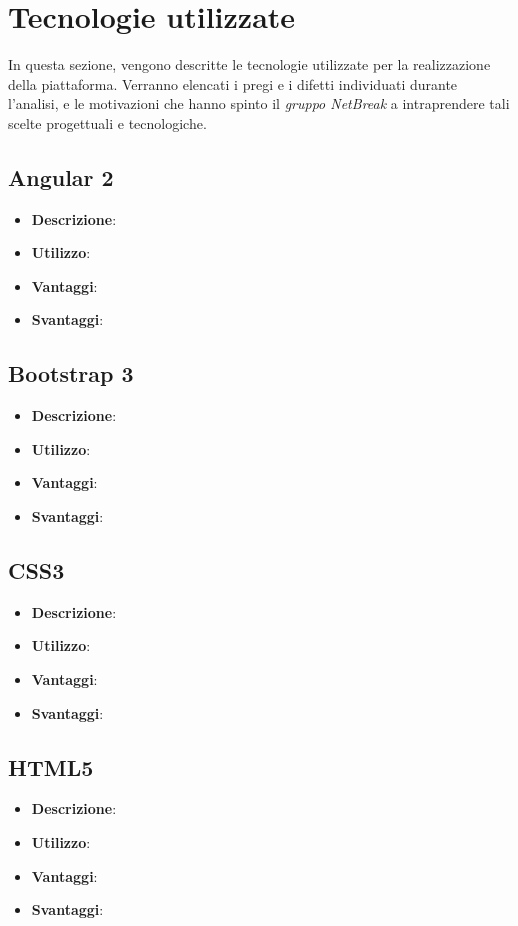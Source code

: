 \newpage
\section{Tecnologie utilizzate}
In questa sezione, vengono descritte le tecnologie utilizzate per la realizzazione della piattaforma. Verranno elencati i pregi e i difetti individuati durante l'analisi, e le motivazioni che hanno spinto il \textit{gruppo NetBreak} a intraprendere tali scelte progettuali e tecnologiche.

\subsection{Angular 2}
\begin{itemize}
	\item \textbf{Descrizione}:
	\item \textbf{Utilizzo}:
	\item \textbf{Vantaggi}:
	\item \textbf{Svantaggi}:
\end{itemize}

\subsection{Bootstrap 3}
\begin{itemize}
	\item \textbf{Descrizione}:
	\item \textbf{Utilizzo}:
	\item \textbf{Vantaggi}:
	\item \textbf{Svantaggi}:
\end{itemize}

\subsection{CSS3}
\begin{itemize}
	\item \textbf{Descrizione}:
	\item \textbf{Utilizzo}:
	\item \textbf{Vantaggi}:
	\item \textbf{Svantaggi}:
\end{itemize}

\subsection{HTML5}
\begin{itemize}
	\item \textbf{Descrizione}:
	\item \textbf{Utilizzo}:
	\item \textbf{Vantaggi}:
	\item \textbf{Svantaggi}:
\end{itemize}

